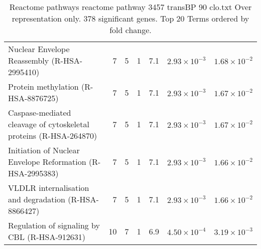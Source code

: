 \begin{table}[ht]
\begin{adjustbox}{width=\textwidth}
\begin{tabular}{lrrrrrr}
  Nuclear Envelope Reassembly (R-HSA-2995410) & 7 & 5 & 1 & 7.1 & $2.93 \times 10^{-3}$ & $1.68 \times 10^{-2}$ \\ 
  Protein methylation (R-HSA-8876725) & 7 & 5 & 1 & 7.1 & $2.93 \times 10^{-3}$ & $1.67 \times 10^{-2}$ \\ 
  Caspase-mediated cleavage of cytoskeletal proteins (R-HSA-264870) & 7 & 5 & 1 & 7.1 & $2.93 \times 10^{-3}$ & $1.67 \times 10^{-2}$ \\ 
  Initiation of Nuclear Envelope Reformation (R-HSA-2995383) & 7 & 5 & 1 & 7.1 & $2.93 \times 10^{-3}$ & $1.66 \times 10^{-2}$ \\ 
  VLDLR internalisation and degradation (R-HSA-8866427) & 7 & 5 & 1 & 7.1 & $2.93 \times 10^{-3}$ & $1.66 \times 10^{-2}$ \\ 
  Regulation of signaling by CBL (R-HSA-912631) & 10 & 7 & 1 & 6.9 & $4.50 \times 10^{-4}$ & $3.19 \times 10^{-3}$ \\ 
   \hline
\end{tabular}
\end{adjustbox}
\caption{Reactome pathways reactome pathway 3457 transBP 90 clo.txt Over representation only. 378 significant genes. Top 20 Terms ordered by fold change. } 
\label{tab:Reactome pathways reactome pathway 3457 transBP 90 clo.txt Over representation only. 378 significant genes. Top 20 Terms ordered by fold change. }
\end{table}


